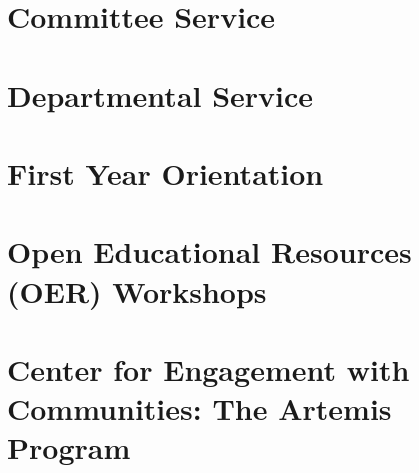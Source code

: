 \documentclass[../../main.tex]{subfiles}
\begin{document}
\label{sec:service}

\section{Committee Service}

%

\begin{flushleft}

\end{flushleft}

\section{Departmental Service}

%

\begin{flushleft}

\end{flushleft}

\section{First Year Orientation}

%

\begin{flushleft}

\end{flushleft}

\section{Open Educational Resources (OER) Workshops}

%

\begin{flushleft}

\end{flushleft}

\section{Center for Engagement with Communities: The Artemis Program}
\label{sec:cec2}

%

\begin{flushleft}

\end{flushleft}
\end{document}
